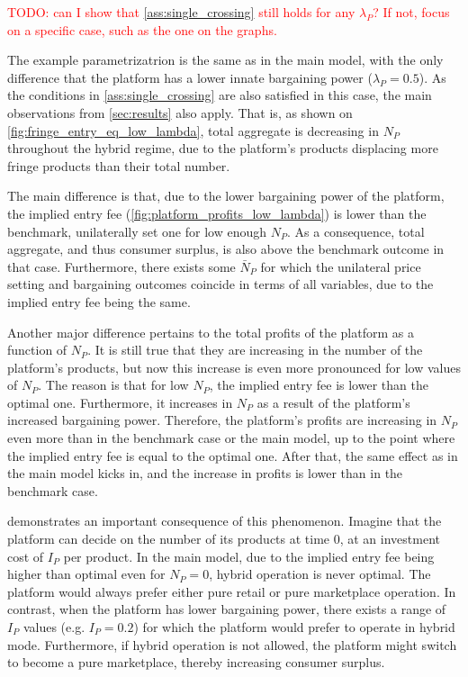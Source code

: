 \documentclass[a4paper]{article}
\begin{document}
\textcolor{red}{TODO: can I show that \cref{ass:single_crossing} still holds for any $\lambda_P$? If not, focus on a specific case, such as the one on the graphs.}

The example parametrizatrion is the same as in the main model, with the only difference that the platform has a lower innate bargaining power ($\lambda_P = 0.5$).
As the conditions in \cref{ass:single_crossing} are also satisfied in this case, the main observations from \cref{sec:results} also apply.
That is, as shown on \cref{fig:fringe_entry_eq_low_lambda}, total aggregate is decreasing in $N_P$ throughout the hybrid regime, due to the platform's products displacing more fringe products than their total number.

The main difference is that, due to the lower bargaining power of the platform, the implied entry fee (\cref{fig:platform_profits_low_lambda}) is lower than the benchmark, unilaterally set one for low enough $N_P$.
As a consequence, total aggregate, and thus consumer surplus, is also above the benchmark outcome in that case.
Furthermore, there exists some $\bar{N}_P$ for which the unilateral price setting and bargaining outcomes coincide in terms of all variables, due to the implied entry fee being the same.

Another major difference pertains to the total profits of the platform as a function of $N_P$.
It is still true that they are increasing in the number of the platform's products, but now this increase is even more pronounced for low values of $N_P$.
The reason is that for low $N_P$, the implied entry fee is lower than the optimal one.
Furthermore, it increases in $N_P$ as a result of the platform's increased bargaining power.
Therefore, the platform's profits are increasing in $N_P$ even more than in the benchmark case or the main model, up to the point where the implied entry fee is equal to the optimal one.
After that, the same effect as in the main model kicks in, and the increase in profits is lower than in the benchmark case.

 demonstrates an important consequence of this phenomenon.
Imagine that the platform can decide on the number of its products at time 0, at an investment cost of $I_P$ per product.
In the main model, due to the implied entry fee being higher than optimal even for $N_P = 0$, hybrid operation is never optimal.
The platform would always prefer either pure retail or pure marketplace operation.
In contrast, when the platform has lower bargaining power, there exists a range of $I_P$ values (e.g. $I_P = 0.2$) for which the platform would prefer to operate in hybrid mode.
Furthermore, if hybrid operation is not allowed, the platform might switch to become a pure marketplace, thereby increasing consumer surplus.
\end{document}
